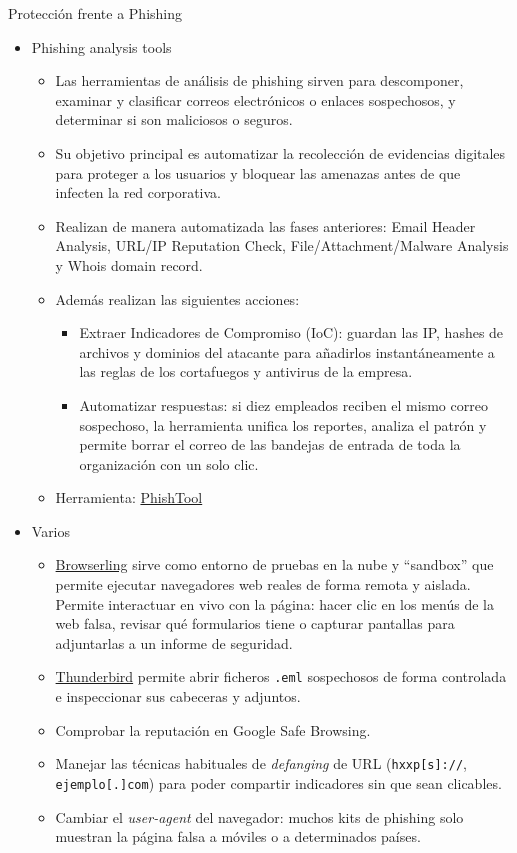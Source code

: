 \documentclass[aspectratio=169,11pt]{beamer}
\newcommand{\cmd}[1]{\texttt{\color{uznavy}#1}}
\begin{document}
\begin{frame}[allowframebreaks]{Protección frente a Phishing}
\begin{itemize}
  \item Phishing analysis tools
    \begin{itemize}
    \item Las herramientas de análisis de phishing sirven para descomponer, examinar y clasificar correos electrónicos o enlaces sospechosos, y determinar si son maliciosos o seguros.
    \item Su objetivo principal es automatizar la recolección de evidencias digitales para proteger a los usuarios y bloquear las amenazas antes de que infecten la red corporativa.
    \item Realizan de manera automatizada las fases anteriores: Email Header Analysis, URL/IP Reputation Check, File/Attachment/Malware Analysis y Whois domain record.
    \item Además realizan las siguientes acciones:
      \begin{itemize}
      \item Extraer Indicadores de Compromiso (IoC): guardan las IP, hashes de archivos y dominios del atacante para añadirlos instantáneamente a las reglas de los cortafuegos y antivirus de la empresa.
      \item Automatizar respuestas: si diez empleados reciben el mismo correo sospechoso, la herramienta unifica los reportes, analiza el patrón y permite borrar el correo de las bandejas de entrada de toda la organización con un solo clic.
      \end{itemize}
    \item Herramienta: \href{https://www.phishtool.com/}{PhishTool}
    \end{itemize}

  \item Varios
    \begin{itemize}
    \item \href{https://www.browserling.com}{Browserling} sirve como entorno de pruebas en la nube y ``sandbox'' que permite ejecutar navegadores web reales de forma remota y aislada. Permite interactuar en vivo con la página: hacer clic en los menús de la web falsa, revisar qué formularios tiene o capturar pantallas para adjuntarlas a un informe de seguridad.
    \item \href{https://www.thunderbird.net/}{Thunderbird} permite abrir ficheros \cmd{.eml} sospechosos de forma controlada e inspeccionar sus cabeceras y adjuntos.
    \item Comprobar la reputación en Google Safe Browsing.
    \item Manejar las técnicas habituales de \emph{defanging} de URL (\cmd{hxxp[s]://}, \cmd{ejemplo[.]com}) para poder compartir indicadores sin que sean clicables.
    \item Cambiar el \emph{user-agent} del navegador: muchos kits de phishing solo muestran la página falsa a móviles o a determinados países.
    \end{itemize}


\end{itemize}
\end{frame}
\end{document}
